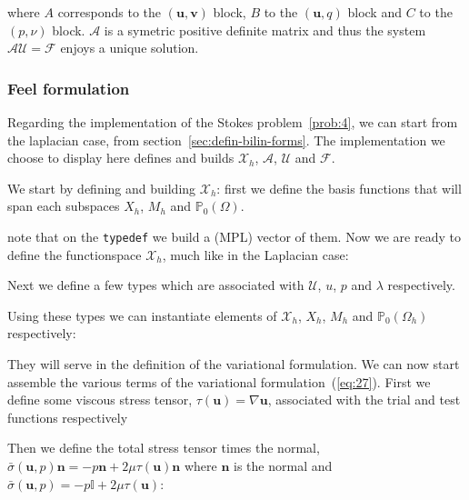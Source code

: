 where $A$ corresponds to the $(\mathbf{u},\mathbf{v})$ block, $B$ to
the $(\mathbf{u},q)$ block and $C$ to the $(p,\nu)$
block. $\mathcal{A}$ is a symetric positive definite matrix and thus
the system $\mathcal{A} \mathcal{U} = \mathcal{F}$ enjoys a unique
solution.

\subsubsection{Feel formulation}
\label{sec:feel-formulation}

Regarding the implementation of the Stokes problem~\ref{prob:4}, we
can start from the laplacian case, from
section~\ref{sec:defin-bilin-forms}. The implementation we choose to
display here defines and builds $\mathcal{X}_h$, $\mathcal{A}$,
$\mathcal{U}$ and $\mathcal{F}$.

We start by defining and building $\mathcal{X}_h$: first we define the
basis functions that will span each subspaces $X_h$, $M_h$ and
$\mathbb{P}_0(\Omega)$.



note that on the \lstinline!typedef! we build a (MPL) vector of them. Now we are
ready to define the functionspace $\mathcal{X}_h$, much like in the
Laplacian case:



Next we define a few types which are associated with $\mathcal{U}$,
$u$, $p$ and $\lambda$ respectively.



Using these types we can instantiate elements of $\mathcal{X}_h$,
$X_h$, $M_h$ and $\mathbb{P}_0(\Omega_h)$ respectively:



They will serve in the definition of the variational formulation. We
can now start assemble the various terms of the variational
formulation~(\ref{eq:27}). First we define some viscous stress tensor,
$\tau(\mathbf{u}) = \nabla \mathbf{u}$,
associated with the trial and test functions
respectively



Then we define the total stress tensor times the normal,
$\bar{\sigma}(\mathbf{u},p) \mathbf{n} = -p \mathbf{n} + 2 \mu \tau(\mathbf{u})
\mathbf{n}$ where $\mathbf{n}$ is the normal and $\bar{\sigma}(\mathbf{u},p) =
-p \mathbb{I} + 2 \mu \tau(\mathbf{u})$:

